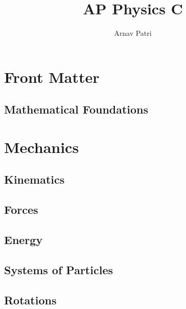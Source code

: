 \documentclass[12pt, A4]{report}
\title{AP Physics C}
\author{Arnav Patri}
\begin{document}
	\maketitle
	\tableofcontents
	\part{Front Matter}
		\chapter{Mathematical Foundations}
			
	\part{Mechanics}
		\chapter{Kinematics}
			
		\chapter{Forces}
			
		\chapter{Energy}
			
		\chapter{Systems of Particles}
			
		\chapter{Rotations}
			
\end{document}
